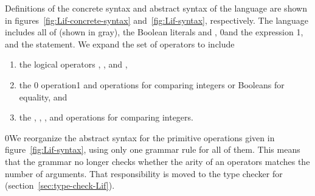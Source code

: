 \documentclass[7x10]{TimesAPriori_MIT}%
\def\racketEd{0}
\def\pythonEd{1}
\def\edition{0}
\newcommand{\racket}[1]{{\if\edition\racketEd{#1}\fi}}
\newcommand{\python}[1]{{\if\edition\pythonEd #1\fi}}
\numberwithin{theorem}{chapter}
\numberwithin{definition}{chapter}
\numberwithin{equation}{chapter}
\begin{document}
Definitions of the concrete syntax and abstract syntax of the
\LangIf{} language are shown in figures~\ref{fig:Lif-concrete-syntax}
and~\ref{fig:Lif-syntax}, respectively. The \LangIf{} language
includes all of \LangVar{} {(shown in gray)}, the Boolean literals
\TRUE{} and \FALSE{}, \racket{and} the  expression
%
\python{, and the \code{if} statement}.  We expand the set of
operators to include
\begin{enumerate}
\item the logical operators , , and ,
\item the \racket{ operation}\python{\key{==} and \key{!=} operations}
  for comparing integers or Booleans for equality, and
\item the \key{<}, \key{<=}, \key{>}, and \key{>=} operations for
  comparing integers.
\end{enumerate}

\racket{We reorganize the abstract syntax for the primitive
  operations given in figure~\ref{fig:Lif-syntax}, using only one grammar
  rule for all of them. This means that the grammar no longer checks
  whether the arity of an operators matches the number of
  arguments. That responsibility is moved to the type checker for
  \LangIf{} (section~\ref{sec:type-check-Lif}).}


\newcommand{\LifGrammarRacket}{
  \begin{array}{lcl}
   \Type &::=& \key{Boolean} \\
    \itm{bool} &::=& \TRUE \MID \FALSE \\  
    \itm{cmp} &::= & \key{eq?} \MID \key{<} \MID \key{<=} \MID \key{>} \MID \key{>=} \\
    \Exp &::=& \itm{bool}
        \MID (\key{and}\;\Exp\;\Exp) \MID (\key{or}\;\Exp\;\Exp)
        \MID (\key{not}\;\Exp) \\
        &\MID& (\itm{cmp}\;\Exp\;\Exp) \MID \CIF{\Exp}{\Exp}{\Exp} 
  \end{array}
}
\newcommand{\LifASTRacket}{
\begin{array}{lcl}
   \Type &::=& \key{Boolean} \\
  \itm{bool} &::=& \code{\#t} \MID \code{\#f} \\
  \itm{cmp} &::= & \code{eq?} \MID \code{<} \MID \code{<=} \MID \code{>} \MID \code{>=} \\
  \itm{op} &::= & \itm{cmp} \MID \code{and} \MID \code{or} \MID \code{not} \\
  \Exp &::=& \BOOL{\itm{bool}} \MID \IF{\Exp}{\Exp}{\Exp} 
\end{array}
}
\newcommand{\LintOpAST}{
  \begin{array}{rcl}
    \Type &::=& \key{Integer} \\
    \itm{op} &::= & \code{read} \MID \code{+} \MID \code{-}\\
    \Exp{} &::=& \INT{\Int} \MID \PRIM{\itm{op}}{\Exp\ldots}    
  \end{array}
}
\end{document}
